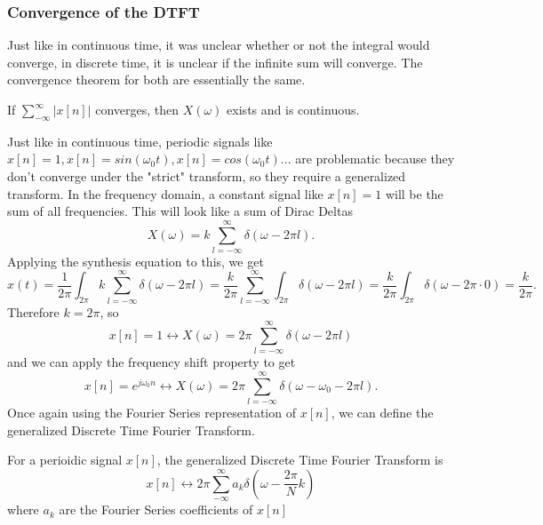 \subsubsection{Convergence of the DTFT}
Just like in continuous time, it was unclear whether or not the integral would converge,
in discrete time, it is unclear if the infinite sum will converge. The convergence theorem for both are essentially the same.
\begin{theorem}
    If $\sum_{-\infty}^{\infty}{|x[n]|}$ converges, then $X(\omega)$ exists and is continuous.
\end{theorem}
Just like in continuous time, periodic signals like $x[n] = 1, x[n] = sin(\omega_0t), x[n]=cos(\omega_0t)...$
are problematic because they don't converge under the "strict" transform, so they require a generalized transform.
In the frequency domain, a constant signal like $x[n] = 1$ will be the sum of all frequencies. This will look like
a sum of Dirac Deltas
\[
  X(\omega) = k \sum_{l=-\infty}^{\infty}{\delta(\omega - 2\pi l)}.
\]
Applying the synthesis equation to this, we get
\[
  x(t) = \frac{1}{2\pi}\int_{2\pi}{k \sum_{l=-\infty}^{\infty}{\delta(\omega - 2\pi l)}} = \frac{k}{2\pi}\sum_{l=-\infty}^{\infty}{\int_{2\pi}{\delta(\omega - 2\pi l)}} = \frac{k}{2\pi}\int_{2\pi}{\delta(\omega - 2\pi \cdot 0)} = \frac{k}{2\pi}.
\]
Therefore $k = 2\pi$, so
\[
x[n] = 1 \leftrightarrow X(\omega) = 2\pi\sum_{l=-\infty}^{\infty}{\delta(\omega - 2\pi l)}
\]
and we can apply the frequency shift property to get
\[
  x[n] = e^{j\omega_0n} \leftrightarrow X(\omega) = 2\pi\sum_{l=-\infty}^{\infty}{\delta(\omega - \omega_0 - 2\pi l)}.
\]
Once again using the Fourier Series representation of $x[n]$, we can define the generalized Discrete Time Fourier Transform.
\begin{definition}
    For a perioidic signal $x[n]$, the generalized Discrete Time Fourier Transform is
    \[
x[n] \leftrightarrow 2\pi\sum_{-\infty}^{\infty}{a_k\delta\left(\omega-\frac{2\pi}{N}k\right)}
\]
    where $a_k$ are the Fourier Series coefficients of $x[n]$
\end{definition}
